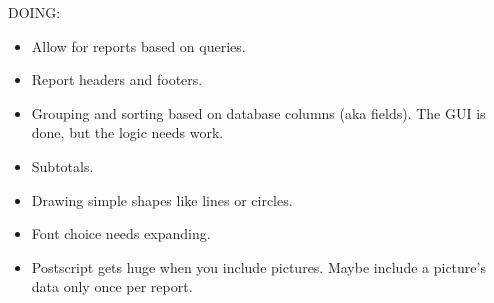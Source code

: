 DOING:
\begin{itemize}
\item Allow for reports based on queries.
\item Report headers and footers.
\item Grouping and sorting based on database columns (aka fields).
  The GUI is done, but the logic needs work.
\item Subtotals.
\item Drawing simple shapes like lines or circles.
\item Font choice needs expanding.
\item Postscript gets huge when you include pictures.  Maybe include a picture's data only once per report.
\end{itemize}
